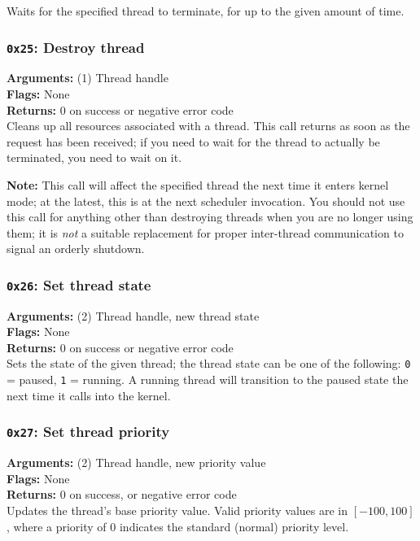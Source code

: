 \documentclass[11pt]{article}
\begin{document}
Waits for the specified thread to terminate, for up to the given amount of time.

\subsubsection{{\tt 0x25}: Destroy thread}
\textbf{Arguments:} (1) Thread handle \\
\textbf{Flags:} None \\
\textbf{Returns:} 0 on success or negative error code \\

Cleans up all resources associated with a thread. This call returns as soon as the request has been received; if you need to wait for the thread to actually be terminated, you need to wait on it.

\textbf{Note:} This call will affect the specified thread the next time it enters kernel mode; at the latest, this is at the next scheduler invocation. You should not use this call for anything other than destroying threads when you are no longer using them; it is \textit{not} a suitable replacement for proper inter-thread communication to signal an orderly shutdown.

\subsubsection{{\tt 0x26}: Set thread state}
\textbf{Arguments:} (2) Thread handle, new thread state \\
\textbf{Flags:} None \\
\textbf{Returns:} 0 on success or negative error code \\

Sets the state of the given thread; the thread state can be one of the following: \texttt{0} = paused, \texttt{1} = running. A running thread will transition to the paused state the next time it calls into the kernel.

\subsubsection{{\tt 0x27}: Set thread priority}
\textbf{Arguments:} (2) Thread handle, new priority value \\
\textbf{Flags:} None \\
\textbf{Returns:} 0 on success, or negative error code \\

Updates the thread's base priority value. Valid priority values are in $[-100, 100]$, where a priority of $0$ indicates the standard (normal) priority level.
\end{document}

